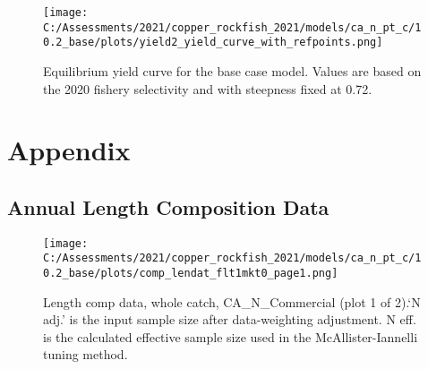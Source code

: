 \documentclass[11pt,
  english,
  a4paper,
]{article}
\begin{document}
\tagmcend\tagstructend


\begin{figure}
\centering
\texttt{[image: C:/Assessments/2021/copper\_rockfish\_2021/models/ca\_n\_pt\_c/10.2\_base/plots/yield2\_yield\_curve\_with\_refpoints.png]}
\caption{Equilibrium yield curve for the base case model. Values are based on the 2020 fishery selectivity and with steepness fixed at 0.72.\label{fig:yield}}
\end{figure}

\tagmcend\tagstructend

\clearpage


\hypertarget{appendix}{%
\section{Appendix}\label{appendix}}

\leavevmode\tagmcend\tagstructend


\hypertarget{annual-length-composition-data}{%
\subsection{Annual Length Composition Data}\label{annual-length-composition-data}}

\leavevmode\tagmcend\tagstructend


\begin{figure}
\centering
\texttt{[image: C:/Assessments/2021/copper\_rockfish\_2021/models/ca\_n\_pt\_c/10.2\_base/plots/comp\_lendat\_flt1mkt0\_page1.png]}
\caption{Length comp data, whole catch, CA\_N\_Commercial (plot 1 of 2).`N adj.' is the input sample size after data-weighting adjustment. N eff. is the calculated effective sample size used in the McAllister-Iannelli tuning method.\label{fig:comp_lendat_flt1mkt0_page1}}
\end{figure}
\end{document}
